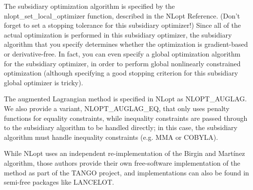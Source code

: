 The subsidiary optimization algorithm is specified by the nlopt\_set\_local\_optimizer function, described in the NLopt Reference. (Don't forget to set a stopping tolerance for this subsidiary optimizer!) Since all of the actual optimization is performed in this subsidiary optimizer, the subsidiary algorithm that you specify determines whether the optimization is gradient-based or derivative-free. In fact, you can even specify a global optimization algorithm for the subsidiary optimizer, in order to perform global nonlinearly constrained optimization (although specifying a good stopping criterion for this subsidiary global optimizer is tricky). 

The augmented Lagrangian method is specified in NLopt as NLOPT\_AUGLAG. We also provide a variant, NLOPT\_AUGLAG\_EQ, that only uses penalty functions for equality constraints, while inequality constraints are passed through to the subsidiary algorithm to be handled directly; in this case, the subsidiary algorithm must handle inequality constraints (e.g. MMA or COBYLA). 

While NLopt uses an independent re-implementation of the Birgin and Martínez algorithm, those authors provide their own free-software implementation of the method as part of the TANGO project, and implementations can also be found in semi-free packages like LANCELOT. 

